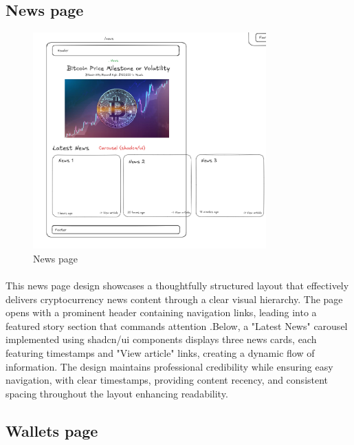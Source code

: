 \subsection{News page}
\begin{figure}[h]
    \centering
    \includegraphics[width= 0.8\textwidth, height=0.6\textheight]{root/news.png}
     \caption{News page}
    \label{fig:news}
\end{figure}
\paragraph{}This news page design showcases a thoughtfully structured layout that effectively delivers cryptocurrency news content through a clear visual hierarchy. The page opens with a prominent header containing navigation links, leading into a featured story section that commands attention .Below, a "Latest News" carousel implemented using shadcn/ui components displays three news cards, each featuring timestamps and "View article" links, creating a dynamic flow of information. The design maintains professional credibility while ensuring easy navigation, with clear timestamps, providing content recency, and consistent spacing throughout the layout enhancing readability.
\subsection{Wallets page}
